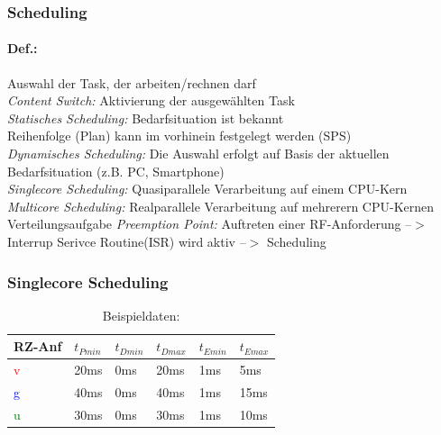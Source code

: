 \documentclass[12pt,a4paper,oneside,ngerman]{article}
\begin{document}
\subsubsection{Scheduling}
\paragraph{Def.:}
Auswahl der Task, der arbeiten/rechnen darf \\
\emph{Content Switch:} Aktivierung der ausgewählten Task \\
\emph{Statisches Scheduling:} Bedarfsituation ist bekannt \\
 Reihenfolge (Plan) kann im vorhinein festgelegt werden (SPS)\\
\emph{Dynamisches Scheduling:} Die Auswahl erfolgt auf Basis der aktuellen Bedarfsituation (z.B. PC, Smartphone)\\
\emph{Singlecore Scheduling:} Quasiparallele Verarbeitung auf einem CPU-Kern\\
\emph{Multicore Scheduling:} Realparallele Verarbeitung auf mehrerern CPU-Kernen\\
 Verteilungsaufgabe
\emph{Preemption Point:} Auftreten einer RF-Anforderung --$>$ Interrup Serivce Routine(ISR) wird aktiv --$>$ Scheduling

\subsubsection{Singlecore Scheduling}
\begin{table}[H]
	\caption{Beispieldaten:}
	\begin{tabular}{|l|l|l|l|l|l|}
	\hline
	RZ-Anf & \(t_{Pmin}\) & \(t_{Dmin}\) & \(t_{Dmax}\) & \(t_{Emin}\) & \(t_{Emax}\) \\ \hline
	\textcolor{red}{v}      & 20ms         & 0ms          & 20ms         & 1ms          & 5ms          \\ \hline
	\textcolor{blue}{g}      & 40ms         & 0ms          & 40ms         & 1ms          & 15ms         \\ \hline
	\textcolor{green}{u}      & 30ms         & 0ms          & 30ms         & 1ms          & 10ms         \\ \hline
	\end{tabular}
\end{table}
\end{document}
